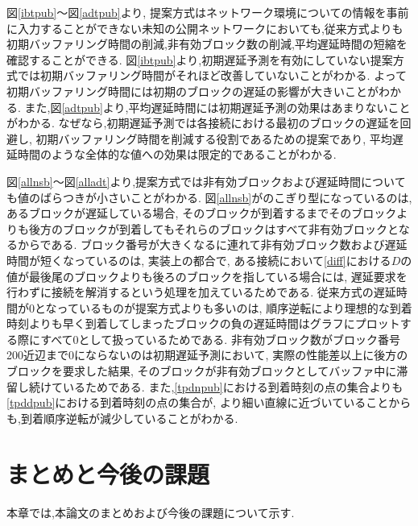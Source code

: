 \documentclass[a4j,12pt]{gradthesis_utf8}
\begin{document}
\clearpage

図\ref{ibtpub}〜図\ref{adtpub}より,
提案方式はネットワーク環境についての情報を事前に入力することができない未知の公開ネットワークにおいても,従来方式よりも初期バッファリング時間の削減,非有効ブロック数の削減,平均遅延時間の短縮を確認することができる.
図\ref{ibtpub}より,初期遅延予測を有効にしていない提案方式では初期バッファリング時間がそれほど改善していないことがわかる.
よって初期バッファリング時間には初期のブロックの遅延の影響が大きいことがわかる.
また,図\ref{adtpub}より,平均遅延時間には初期遅延予測の効果はあまりないことがわかる.
なぜなら,初期遅延予測では各接続における最初のブロックの遅延を回避し,
初期バッファリング時間を削減する役割であるための提案であり,
平均遅延時間のような全体的な値への効果は限定的であることがわかる.


図\ref{allnsb}〜図\ref{alladt}より,提案方式では非有効ブロックおよび遅延時間についても値のばらつきが小さいことがわかる.
図\ref{allnsb}がのこぎり型になっているのは,あるブロックが遅延している場合,
そのブロックが到着するまでそのブロックよりも後方のブロックが到着してもそれらのブロックはすべて非有効ブロックとなるからである.
ブロック番号が大きくなるに連れて非有効ブロック数および遅延時間が短くなっているのは,
実装上の都合で,
ある接続において\ref{diff}における\begin{math}D\end{math}の値が最後尾のブロックよりも後ろのブロックを指している場合には,
遅延要求を行わずに接続を解消するという処理を加えているためである.
従来方式の遅延時間が0となっているものが提案方式よりも多いのは,
順序逆転により理想的な到着時刻よりも早く到着してしまったブロックの負の遅延時間はグラフにプロットする際にすべて0として扱っているためである.
非有効ブロック数がブロック番号200近辺まで0にならないのは初期遅延予測において,
実際の性能差以上に後方のブロックを要求した結果,
そのブロックが非有効ブロックとしてバッファ中に滞留し続けているためである.
また,\ref{tpdnpub}における到着時刻の点の集合よりも\ref{tpddpub}における到着時刻の点の集合が,
より細い直線に近づいていることからも,到着順序逆転が減少していることがわかる.
 
\chapter{まとめと今後の課題}\label{matomekongo}
本章では,本論文のまとめおよび今後の課題について示す.
\end{document}

